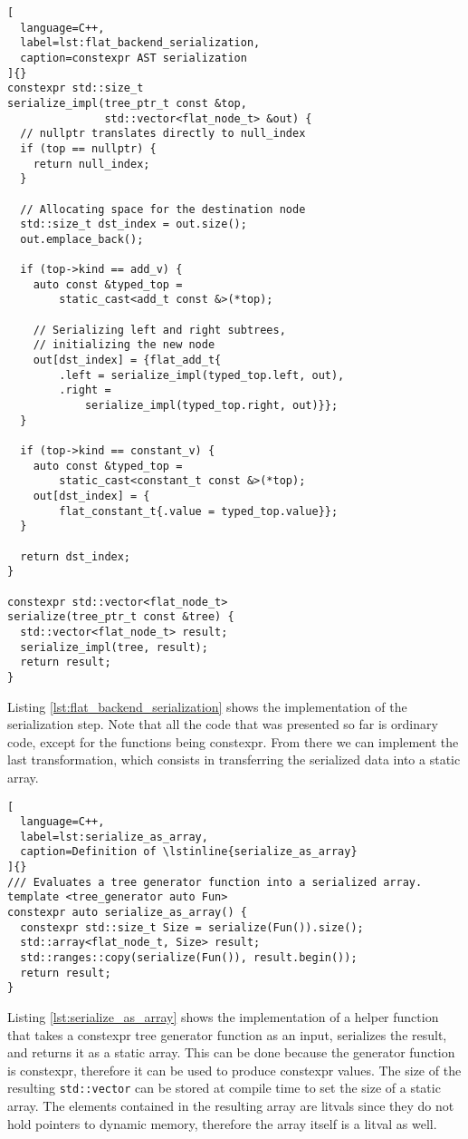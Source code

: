 \documentclass[../main]{subfiles}
\begin{document}
\begin{lstlisting}[
  language=C++,
  label=lst:flat_backend_serialization,
  caption=constexpr AST serialization
]{}
constexpr std::size_t
serialize_impl(tree_ptr_t const &top,
               std::vector<flat_node_t> &out) {
  // nullptr translates directly to null_index
  if (top == nullptr) {
    return null_index;
  }

  // Allocating space for the destination node
  std::size_t dst_index = out.size();
  out.emplace_back();

  if (top->kind == add_v) {
    auto const &typed_top =
        static_cast<add_t const &>(*top);

    // Serializing left and right subtrees,
    // initializing the new node
    out[dst_index] = {flat_add_t{
        .left = serialize_impl(typed_top.left, out),
        .right =
            serialize_impl(typed_top.right, out)}};
  }

  if (top->kind == constant_v) {
    auto const &typed_top =
        static_cast<constant_t const &>(*top);
    out[dst_index] = {
        flat_constant_t{.value = typed_top.value}};
  }

  return dst_index;
}

constexpr std::vector<flat_node_t>
serialize(tree_ptr_t const &tree) {
  std::vector<flat_node_t> result;
  serialize_impl(tree, result);
  return result;
}
\end{lstlisting}

Listing \ref{lst:flat_backend_serialization} shows the implementation of the
serialization step. Note that all the code that was presented so far
is ordinary \cpp code, except for the functions being \gls{constexpr}.
From there we can implement the last transformation, which consists
in transferring the serialized data into a static array.

\begin{lstlisting}[
  language=C++,
  label=lst:serialize_as_array,
  caption=Definition of \lstinline{serialize_as_array}
]{}
/// Evaluates a tree generator function into a serialized array.
template <tree_generator auto Fun>
constexpr auto serialize_as_array() {
  constexpr std::size_t Size = serialize(Fun()).size();
  std::array<flat_node_t, Size> result;
  std::ranges::copy(serialize(Fun()), result.begin());
  return result;
}
\end{lstlisting}

Listing \ref{lst:serialize_as_array} shows the implementation of a helper
function that takes a \gls{constexpr} tree generator function as an input,
serializes the result, and returns it as a static array.
This can be done because the generator function is \gls{constexpr}, therefore it
can be used to produce \gls{constexpr} values. The size of the resulting
\lstinline{std::vector} can be stored at compile time to set the size
of a static array.
The elements contained in the resulting array are \glspl{litval} since they do
not hold pointers to dynamic memory, therefore the array itself is a
\gls{litval} as well.
\end{document}
